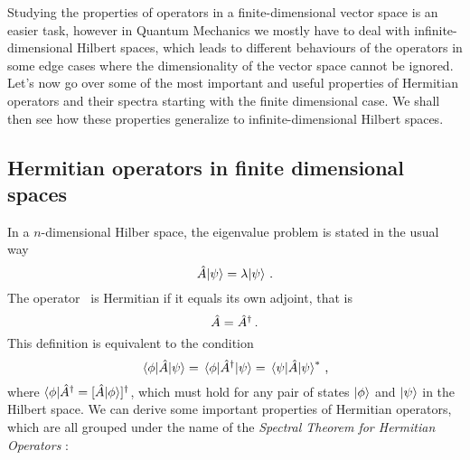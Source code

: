         Studying the properties of operators in a finite-dimensional vector space is an easier task, however in Quantum Mechanics we mostly have to deal with infinite-dimensional Hilbert spaces, which leads to different behaviours of the operators in some edge cases where the dimensionality of the vector space cannot be ignored. Let's now go over some of the most important and useful properties of Hermitian operators and their spectra \cite{Bernardini1993-iy} starting with the finite dimensional case. We shall then see how these properties generalize to infinite-dimensional Hilbert spaces.

        \subsection{Hermitian operators in finite dimensional spaces}
            In a $n$-dimensional Hilber space, the eigenvalue problem is stated in the usual way
            \begin{equation*}
                \hat{A}\! \ket{\psi} = \lambda\! \ket{\psi}
                \,\text{.}
            \end{equation*}
            The operator \hA\ is Hermitian if it equals its own adjoint, that is
            \begin{equation*}
                \hat{A} = \hat{A}^\dagger
                \,\text{.}
            \end{equation*}
            This definition is equivalent to the condition
            \begin{equation}
                \label{eq:hermiticity-inner-product}
                \mel{\phi}{\ensuremath{\hat{A}}}{\psi}
                = \mel{\phi}{\ensuremath{\hat{A}}^\dag}{\psi}
                = \mel{\psi}{\ensuremath{\hat{A}}}{\psi}^*
                \,\text{,}
            \end{equation}
            where $\bra{\phi}\!\hA^\dag = \bqty*{\hA\!\ket{\phi}}\!^\dag$, which must hold for any pair of states $\ket{\phi}$ and $\ket{\psi}$ in the Hilbert space. We can derive some important properties of Hermitian operators, which are all grouped under the name of the \emph{Spectral Theorem for Hermitian Operators} \cite{Bernardini1993-iy}:
